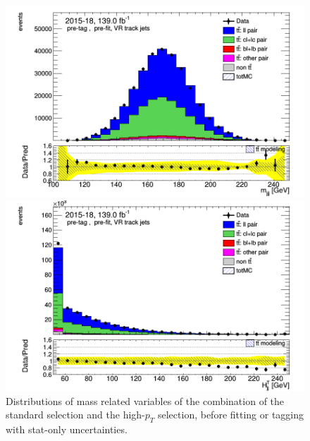 \documentclass[letterpaper,12pt]{article}
\begin{document}
\begin{figure}
\begin{minipage}[b]{.45\textwidth}
	\centering
	\includegraphics[width=1\textwidth]{Oct_distributions/pretagNoRwDL1rwithhighpTVRJets_scaledall/DataMC_mjjj.png}
	\end{minipage}\hfill
	\begin{minipage}[b]{.45\textwidth}
	\centering
	\includegraphics[width=1\textwidth]{Oct_distributions/pretagNoRwDL1rwithhighpTVRJets_scaledall/DataMC_Htjj.png}
	\end{minipage}
	\caption{Distributions of mass related variables of the combination 
	of the standard selection and the high-$p_T$ selection, 
	before fitting or tagging with stat-only uncertainties.} \label{fig:mass_VRJets}
	\end{figure}
	
\end{document}
